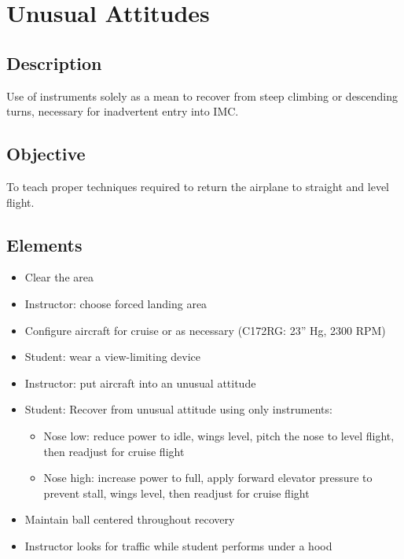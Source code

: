 \section{Unusual Attitudes}

\subsection{Description}

Use of instruments solely as a mean to recover from steep climbing or
descending turns, necessary for inadvertent entry into IMC.

\subsection{Objective}

To teach proper techniques required to return the airplane to straight and
level flight.

\subsection{Elements}

\begin{itemize}
  \item Clear the area
  \item Instructor: choose forced landing area
  \item Configure aircraft for cruise or as necessary (C172RG: 23'' Hg, 2300
    RPM)
  \item Student: wear a view-limiting device
  \item Instructor: put aircraft into an unusual attitude
  \item Student: Recover from unusual attitude using only instruments:
    \begin{itemize}
      \item Nose low: reduce power to idle, wings level, pitch the nose to
        level flight, then readjust for cruise flight
      \item Nose high: increase power to full, apply forward elevator pressure
        to prevent stall, wings level, then readjust for cruise flight
    \end{itemize}
  \item Maintain ball centered throughout recovery
  \item Instructor looks for traffic while student performs under a hood
\end{itemize}

